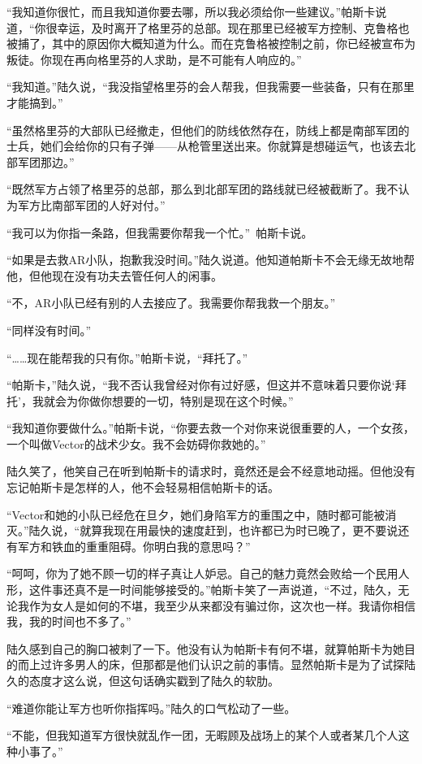 “我知道你很忙，而且我知道你要去哪，所以我必须给你一些建议。”帕斯卡说道，“你很幸运，及时离开了格里芬的总部。现在那里已经被军方控制、克鲁格也被捕了，其中的原因你大概知道为什么。而在克鲁格被控制之前，你已经被宣布为叛徒。你现在再向格里芬的人求助，是不可能有人响应的。”

“我知道。”陆久说，“我没指望格里芬的会人帮我，但我需要一些装备，只有在那里才能搞到。”

“虽然格里芬的大部队已经撤走，但他们的防线依然存在，防线上都是南部军团的士兵，她们会给你的只有子弹——从枪管里送出来。你就算是想碰运气，也该去北部军团那边。”

“既然军方占领了格里芬的总部，那么到北部军团的路线就已经被截断了。我不认为军方比南部军团的人好对付。”

“我可以为你指一条路，但我需要你帮我一个忙。” 帕斯卡说。

“如果是去救AR小队，抱歉我没时间。”陆久说道。他知道帕斯卡不会无缘无故地帮他，但他现在没有功夫去管任何人的闲事。

“不，AR小队已经有别的人去接应了。我需要你帮我救一个朋友。”

“同样没有时间。”

“……现在能帮我的只有你。”帕斯卡说，“拜托了。”

“帕斯卡，”陆久说，“我不否认我曾经对你有过好感，但这并不意味着只要你说‘拜托’，我就会为你做你想要的一切，特别是现在这个时候。”

“我知道你要做什么。”帕斯卡说，“你要去救一个对你来说很重要的人，一个女孩，一个叫做Vector的战术少女。我不会妨碍你救她的。”

陆久笑了，他笑自己在听到帕斯卡的请求时，竟然还是会不经意地动摇。但他没有忘记帕斯卡是怎样的人，他不会轻易相信帕斯卡的话。

“Vector和她的小队已经危在旦夕，她们身陷军方的重围之中，随时都可能被消灭。”陆久说，“就算我现在用最快的速度赶到，也许都已为时已晚了，更不要说还有军方和铁血的重重阻碍。你明白我的意思吗？”

“呵呵，你为了她不顾一切的样子真让人妒忌。自己的魅力竟然会败给一个民用人形，这件事还真不是一时间能够接受的。”帕斯卡笑了一声说道，“不过，陆久，无论我作为女人是如何的不堪，我至少从来都没有骗过你，这次也一样。我请你相信我，我的时间也不多了。”

陆久感到自己的胸口被刺了一下。他没有认为帕斯卡有何不堪，就算帕斯卡为她目的而上过许多男人的床，但那都是他们认识之前的事情。显然帕斯卡是为了试探陆久的态度才这么说，但这句话确实戳到了陆久的软肋。

“难道你能让军方也听你指挥吗。”陆久的口气松动了一些。

“不能，但我知道军方很快就乱作一团，无暇顾及战场上的某个人或者某几个人这种小事了。”

